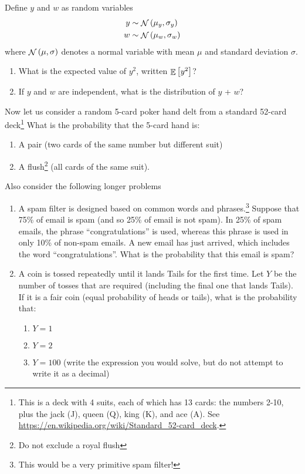 \documentclass[paper=letter, fontsize=11pt]{scrartcl}
\numberwithin{equation}{section}
\numberwithin{figure}{section}
\numberwithin{table}{section}
\DeclareMathOperator{\normal}{\mathcal{N}}
\DeclareMathOperator{\expectation}{\mathbb{E}}
\begin{document}
Define $y$ and $w$ as random variables
\begin{align}
  y &\sim \normal\qty(\mu_y, \sigma_y) \\
  w &\sim \normal\qty(\mu_w, \sigma_w)
\end{align}
where $\normal \qty(\mu, \sigma)$ denotes a normal variable with mean $\mu$ and standard deviation $\sigma$.
\begin{enumerate}[resume]
  \item What is the expected value of $y^2$, written $\expectation\qty[y^2]$?
  \item If $y$ and $w$ are independent, what is the distribution of $y$ + $w$?
\end{enumerate}
Now let us consider a random 5-card poker hand delt from a standard 52-card deck\footnote{This is a deck with 4 suits, each of which has 13 cards: the numbers 2-10, plus the jack (J), queen (Q), king (K), and ace (A). See \url{https://en.wikipedia.org/wiki/Standard_52-card_deck}.}
What is the probability that the 5-card hand is:
\begin{enumerate}[resume]
  \item A pair (two cards of the same number but different suit)
  \item A flush\footnote{Do not exclude a royal flush} (all cards of the same suit).
\end{enumerate}
Also consider the following longer problems
\begin{enumerate}[resume]
  \item A spam filter is designed based on common words and phrases.\footnote{This would be a very primitive spam filter!}
  Suppose that 75\% of email is spam (and so 25\% of email is not spam).
  In 25\% of spam emails, the phrase ``congratulations'' is used, whereas this phrase is used in only 10\% of non-spam emails.
  A new email has just arrived, which includes the word ``congratulations''.
  What is the probability that this email is spam?
  \item A coin is tossed repeatedly until it lands Tails for the first time.
  Let $Y$ be the number of tosses that are required (including the final one that lands Tails).
  If it is a fair coin (equal probability of heads or tails), what is the probability that:
  \begin{enumerate}
    \item $Y=1$
    \item $Y=2$
    \item $Y=100$ (write the expression you would solve, but do not attempt to write it as a decimal)
  \end{enumerate}

\end{enumerate}

\end{document}
